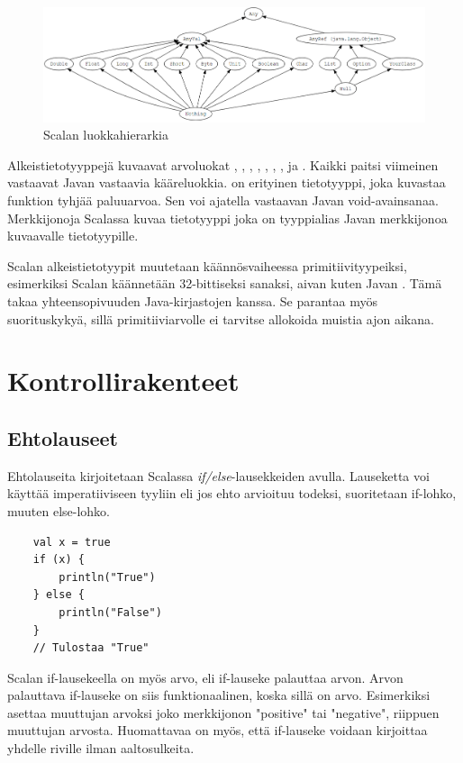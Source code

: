 \begin{figure}[h]
    \centering \includegraphics[width=1\textwidth]{kuvat/typehierarchy}
    \caption{Scalan luokkahierarkia}
    \label{tyyppihierarkia}
\end{figure}

Alkeistietotyyppejä kuvaavat arvoluokat , , , , , , ,  ja . Kaikki paitsi viimeinen vastaavat Javan vastaavia kääreluokkia.  on erityinen tietotyyppi, joka kuvastaa funktion tyhjää paluuarvoa. Sen voi ajatella vastaavan Javan void-avainsanaa. Merkkijonoja Scalassa kuvaa tietotyyppi  joka on tyyppialias Javan merkkijonoa kuvaavalle tietotyypille.
\cite[Luku 5]{prorgrammingInScala3rd}

Scalan alkeistietotyypit muutetaan käännösvaiheessa primitiivityypeiksi, esimerkiksi Scalan  käännetään 32-bittiseksi sanaksi, aivan kuten Javan . Tämä takaa yhteensopivuuden Java-kirjastojen kanssa. Se parantaa myös suorituskykyä, sillä primitiiviarvolle ei tarvitse allokoida muistia ajon aikana.
\cite[Luku 6]{prorgrammingInScala3rd}


\section{Kontrollirakenteet}

\subsection{Ehtolauseet}
Ehtolauseita kirjoitetaan Scalassa \textit{if/else}-lausekkeiden avulla. Lauseketta voi käyttää imperatiiviseen tyyliin eli jos ehto arvioituu todeksi, suoritetaan if-lohko, muuten else-lohko.
\begin{lstlisting}
    val x = true
    if (x) {
        println("True")
    } else {
        println("False")
    }
    // Tulostaa "True"
\end{lstlisting}
Scalan if-lausekeella on myös arvo, eli if-lauseke palauttaa arvon. Arvon palauttava if-lauseke on siis funktionaalinen, koska sillä on arvo. Esimerkiksi  asettaa muuttujan  arvoksi joko merkkijonon "positive" tai "negative", riippuen muuttujan  arvosta. Huomattavaa on myös, että if-lauseke voidaan kirjoittaa yhdelle riville ilman aaltosulkeita. 
\cite[Luku 2.1]{scalaForTheImpatient}
        

